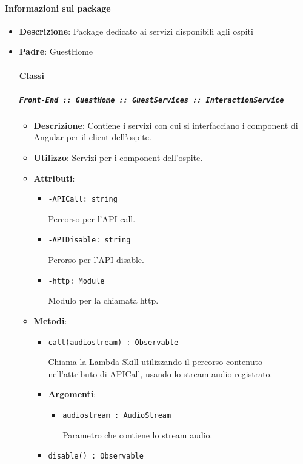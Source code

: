 \documentclass[../DefinizioneDiProdotto.tex]{subfiles}
\begin{document}
	\paragraph{Informazioni sul package}\begin{itemize}\item \textbf{Descrizione}: Package dedicato ai servizi disponibili agli ospiti \item \textbf{Padre}: GuestHome\paragraph{Classi}
	\subparagraph{\texttt{Front-End :: GuestHome :: GuestServices :: InteractionService}}
	\begin{itemize}\item \textbf{Descrizione}: Contiene i servizi con cui si interfacciano i component di Angular per il client dell'ospite.
	\item \textbf{Utilizzo}: Servizi per i component dell'ospite.
	\item \textbf{Attributi}:
	\begin{itemize}
	\item \texttt{-APICall: string}\

	 Percorso per l'API call.
	\end{itemize}
	\begin{itemize}
	\item \texttt{-APIDisable: string}\

	 Perorso per l'API disable.
	\end{itemize}
	\begin{itemize}
	\item \texttt{-http: Module}\

	 Modulo per la chiamata http.
	\end{itemize}
	\item \textbf{Metodi}:
	\begin{itemize}
	\item \texttt{call(audiostream) : Observable}\

	 Chiama la Lambda Skill utilizzando il percorso contenuto nell'attributo di APICall, usando lo stream audio registrato.

	\item \textbf{Argomenti}:
	\begin{itemize}
	\item \texttt{audiostream : AudioStream}\

	 Parametro che contiene lo stream audio.
	\end{itemize}
	\end{itemize}\vspace{0.5em}
	\begin{itemize}
	\item \texttt{disable() : Observable}\


\end{itemize}
\end{itemize}
\end{itemize}
\end{document}

